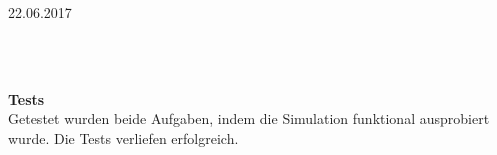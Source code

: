 \documentclass{rp}
\begin{document}


{22.06.2017} %

%
\\



\\
\textbf{Tests}\\
Getestet wurden beide Aufgaben, indem die Simulation funktional ausprobiert wurde. Die Tests verliefen erfolgreich.
\end{document}
